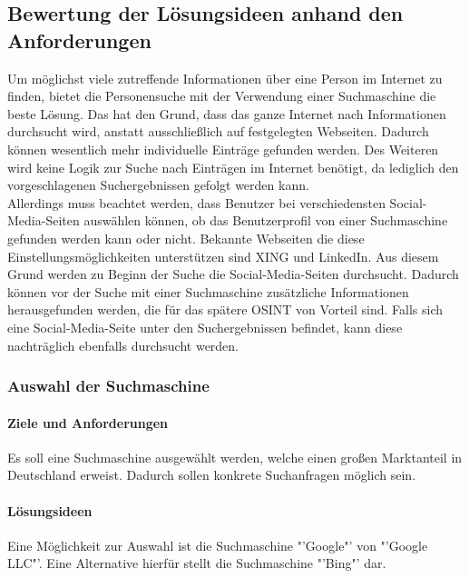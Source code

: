 		\subsection{Bewertung der Lösungsideen anhand den Anforderungen}
		Um möglichst viele zutreffende Informationen über eine Person im Internet zu finden, bietet die Personensuche mit der Verwendung einer Suchmaschine die beste Lösung. Das hat den Grund, dass das ganze Internet nach Informationen durchsucht wird, anstatt ausschließlich auf festgelegten Webseiten. Dadurch können wesentlich mehr individuelle Einträge gefunden werden. Des Weiteren wird keine Logik zur Suche nach Einträgen im Internet benötigt, da lediglich den vorgeschlagenen Suchergebnissen gefolgt werden kann.\\
		Allerdings muss beachtet werden, dass Benutzer bei verschiedensten Social-Media-Seiten auswählen können, ob das Benutzerprofil von einer Suchmaschine gefunden werden kann oder nicht. Bekannte Webseiten die diese Einstellungsmöglichkeiten unterstützen sind XING und LinkedIn. Aus diesem Grund werden zu Beginn der Suche die Social-Media-Seiten durchsucht. Dadurch können vor der Suche mit einer Suchmaschine zusätzliche Informationen herausgefunden werden, die für das spätere OSINT von Vorteil sind. Falls sich eine Social-Media-Seite unter den Suchergebnissen befindet, kann diese nachträglich ebenfalls durchsucht werden.
		
			\subsubsection{Auswahl der Suchmaschine}
				\paragraph{Ziele und Anforderungen}
				Es soll eine Suchmaschine ausgewählt werden, welche einen großen Marktanteil in Deutschland erweist. Dadurch sollen konkrete Suchanfragen möglich sein. 
				\paragraph{Lösungsideen}
				Eine Möglichkeit zur Auswahl ist die Suchmaschine "'Google"' von "'Google LLC"'. Eine Alternative hierfür stellt die Suchmaschine "'Bing"' dar.
